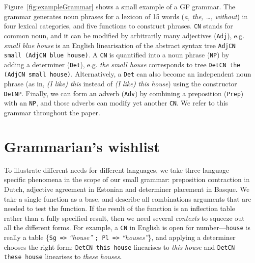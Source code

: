 \documentclass[11pt]{article}
\def\t#1{\texttt{#1}}
\begin{document}
Figure~\ref{fig:exampleGrammar} shows a small example of a GF
grammar. The grammar generates noun phrases for a lexicon of 15
words (\emph{a, the, \dots, without}) in four lexical categories,
and five functions to construct phrases. \t{CN} stands for common
noun, and it can be modified by arbitrarily many adjectives (\t{Adj}),
e.g. \emph{small blue house} is an English linearisation of the
abstract syntax tree \t{AdjCN small (AdjCN blue house)}. A \t{CN} is
quantified into a noun phrase (\t{NP}) by adding a determiner
(\t{Det}), e.g. \emph{the small house} corresponds to tree \t{DetCN the (AdjCN small
  house)}. Alternatively, a \t{Det} can also become an independent
noun phrase (as in, \emph{(I like) this} instead of \emph{(I like) this
  house}) using the constructor \t{DetNP}. Finally, we can form an
adverb (\t{Adv}) by combining a preposition (\t{Prep}) with an \t{NP},
and those adverbs can modify yet another \t{CN}. 
We refer to this grammar throughout the paper.



\section{Grammarian's wishlist}

To illustrate different needs for different languages, we
take three language-specific phenomena in the scope of our
small grammar: preposition contraction in Dutch, adjective agreement
in Estonian and determiner placement in Basque. We take a single
function as a base, and describe all combinations arguments that are
needed to test the function. If the result of the function is an
inflection table rather than a fully specified result, then we need
several \emph{contexts} to squeeze out all the different forms.
For example, a \t{CN} in English is open for number---\t{house} is
really a table \{\t{Sg =>} \emph{``house''} \t{; Pl =>} \emph{``houses''}\}, and
applying a determiner chooses the right form: \t{DetCN this house}
linearises to \emph{this house} and \t{DetCN these house} linearises
to \emph{these houses}. 
\end{document}
